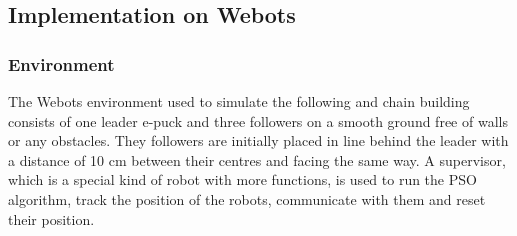 \documentclass[a4, 10 pt, conference]{ieeeconf}  %
\begin{document}
\addtolength{\textheight}{-3cm}   %
                                  
\subsection{Implementation on Webots}

\subsubsection{Environment}
The Webots environment used to simulate the following and chain building consists of one leader e-puck and three followers on a smooth ground free of walls or any obstacles. They followers are initially placed in line behind the leader with a distance of 10 cm between their centres and facing the same way. A supervisor, which is a special kind of robot with more functions, is used to run the PSO algorithm, track the position of the robots, communicate with them and reset their position.
\end{document}
